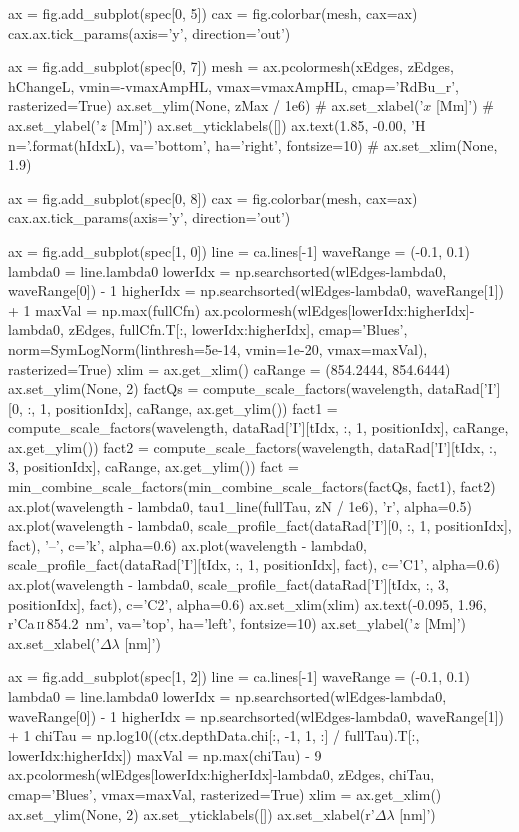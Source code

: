 \begin{pycode}[2DRT]
    ax = fig.add_subplot(spec[0, 5])
    cax = fig.colorbar(mesh, cax=ax)
    cax.ax.tick_params(axis='y', direction='out')

    ax = fig.add_subplot(spec[0, 7])
    mesh = ax.pcolormesh(xEdges, zEdges, hChangeL, vmin=-vmaxAmpHL, vmax=vmaxAmpHL,
                         cmap='RdBu_r', rasterized=True)
    ax.set_ylim(None, zMax / 1e6)
    # ax.set_xlabel('$x$ [Mm]')
    # ax.set_ylabel('$z$ [Mm]')
    ax.set_yticklabels([])
    ax.text(1.85, -0.00, 'H n={}'.format(hIdxL), va='bottom', ha='right', fontsize=10)
    # ax.set_xlim(None, 1.9)

    ax = fig.add_subplot(spec[0, 8])
    cax = fig.colorbar(mesh, cax=ax)
    cax.ax.tick_params(axis='y', direction='out')

    ax = fig.add_subplot(spec[1, 0])
    line = ca.lines[-1]
    waveRange = (-0.1, 0.1)
    lambda0 = line.lambda0
    lowerIdx = np.searchsorted(wlEdges-lambda0, waveRange[0]) - 1
    higherIdx = np.searchsorted(wlEdges-lambda0, waveRange[1]) + 1
    maxVal = np.max(fullCfn)
    ax.pcolormesh(wlEdges[lowerIdx:higherIdx]-lambda0, zEdges, fullCfn.T[:, lowerIdx:higherIdx],
                  cmap='Blues', norm=SymLogNorm(linthresh=5e-14, vmin=1e-20, vmax=maxVal), rasterized=True)
    xlim = ax.get_xlim()
    caRange = (854.2444, 854.6444)
    ax.set_ylim(None, 2)
    factQs = compute_scale_factors(wavelength, dataRad['I'][0, :, 1, positionIdx], caRange, ax.get_ylim())
    fact1 = compute_scale_factors(wavelength, dataRad['I'][tIdx, :, 1, positionIdx], caRange, ax.get_ylim())
    fact2 = compute_scale_factors(wavelength, dataRad['I'][tIdx, :, 3, positionIdx], caRange, ax.get_ylim())
    fact = min_combine_scale_factors(min_combine_scale_factors(factQs, fact1), fact2)
    ax.plot(wavelength - lambda0, tau1_line(fullTau, zN / 1e6), 'r', alpha=0.5)
    ax.plot(wavelength - lambda0,
            scale_profile_fact(dataRad['I'][0, :, 1, positionIdx], fact), '--', c='k', alpha=0.6)
    ax.plot(wavelength - lambda0,
            scale_profile_fact(dataRad['I'][tIdx, :, 1, positionIdx], fact), c='C1', alpha=0.6)
    ax.plot(wavelength - lambda0,
            scale_profile_fact(dataRad['I'][tIdx, :, 3, positionIdx], fact), c='C2', alpha=0.6)
    ax.set_xlim(xlim)
    ax.text(-0.095, 1.96, r'Ca\,\textsc{ii}\,\SI{854.2}{\nano\metre}', va='top', ha='left', fontsize=10)
    ax.set_ylabel('$z$ [Mm]')
    ax.set_xlabel('$\Delta\lambda$ [nm]')

    ax = fig.add_subplot(spec[1, 2])
    line = ca.lines[-1]
    waveRange = (-0.1, 0.1)
    lambda0 = line.lambda0
    lowerIdx = np.searchsorted(wlEdges-lambda0, waveRange[0]) - 1
    higherIdx = np.searchsorted(wlEdges-lambda0, waveRange[1]) + 1
    chiTau = np.log10((ctx.depthData.chi[:, -1, 1, :] / fullTau).T[:, lowerIdx:higherIdx])
    maxVal = np.max(chiTau) - 9
    ax.pcolormesh(wlEdges[lowerIdx:higherIdx]-lambda0, zEdges,
                  chiTau,
                  cmap='Blues', vmax=maxVal, rasterized=True)
    xlim = ax.get_xlim()
    ax.set_ylim(None, 2)
    ax.set_yticklabels([])
    ax.set_xlabel(r'$\Delta\lambda$ [nm]')


\end{pycode}
